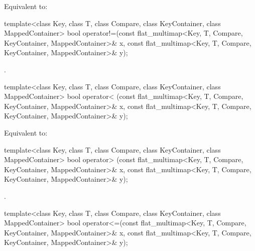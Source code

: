 \begin{codeblock}
\begin{codeblock}
\begin{codeblock}
\begin{addedblock}
\begin{itemdescr}
\pnum
\effects Equivalent to:
\end{itemdescr}

%
\begin{itemdecl}
template<class Key, class T, class Compare, class KeyContainer, class MappedContainer>
  bool operator!=(const flat_multimap<Key, T, Compare, KeyContainer, MappedContainer>& x,
                  const flat_multimap<Key, T, Compare, KeyContainer, MappedContainer>& y);
\end{itemdecl}

\begin{itemdescr}
\pnum \returns {}.
\end{itemdescr}

%
\begin{itemdecl}
template<class Key, class T, class Compare, class KeyContainer, class MappedContainer>
  bool operator< (const flat_multimap<Key, T, Compare, KeyContainer, MappedContainer>& x,
                  const flat_multimap<Key, T, Compare, KeyContainer, MappedContainer>& y);
\end{itemdecl}

\begin{itemdescr}
\pnum
\effects Equivalent to:
\end{itemdescr}

%
\begin{itemdecl}
template<class Key, class T, class Compare, class KeyContainer, class MappedContainer>
  bool operator> (const flat_multimap<Key, T, Compare, KeyContainer, MappedContainer>& x,
                  const flat_multimap<Key, T, Compare, KeyContainer, MappedContainer>& y);
\end{itemdecl}

\begin{itemdescr}
\pnum \returns {}.
\end{itemdescr}

%
\begin{itemdecl}
template<class Key, class T, class Compare, class KeyContainer, class MappedContainer>
  bool operator<=(const flat_multimap<Key, T, Compare, KeyContainer, MappedContainer>& x,
                  const flat_multimap<Key, T, Compare, KeyContainer, MappedContainer>& y);
\end{itemdecl}


\end{addedblock}
\end{codeblock}
\end{codeblock}
\end{codeblock}
